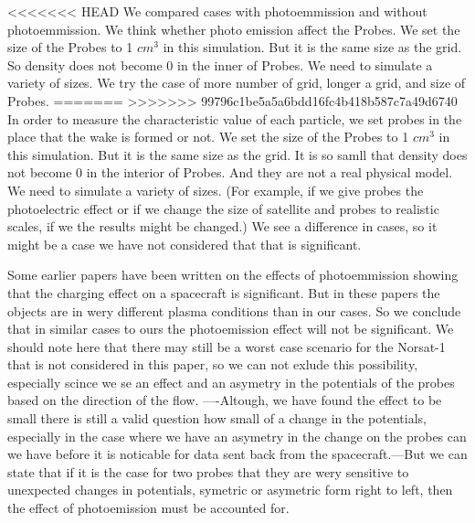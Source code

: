 

<<<<<<< HEAD
We compared cases with photoemmission and without photoemmission. We think whether photo emission affect the Probes.
We set the size of the Probes to 1 $cm^3$ in this simulation. But it is the same size as the grid.
So density does not become 0 in the inner of Probes. We need to simulate a variety of sizes.
We try the case of more number of grid, longer a grid, and size of Probes.
=======
>>>>>>> 99796c1be5a5a6bdd16fc4b418b587c7a49d6740
In order to measure the characteristic value of each particle, we set probes in the
place that the wake is formed or not. 
We set the size of the Probes to 1 $cm^3$ in this simulation. But it is the same size as the grid.
It is so samll that density does not become 0 in the interior of Probes. And they are not a real 
physical model. We need to simulate a variety of sizes.
(For example, if we give probes the photoelectric effect or if we change the size of satellite and 
probes to realistic scales, if we the results might be changed.)
We see a difference in cases, so it might be a case we have not considered that that is significant.

Some earlier papers have been written on the effects of photoemmission showing that the charging effect 
on a spacecraft is significant.\citep{Ergun} But in these papers the objects are in wery different
plasma conditions than in our cases. So we conclude that in similar cases to ours the photoemission effect
will not be significant. We should note here that there may still be a worst case scenario for the Norsat-1
that is not considered in this paper, so we can not exlude this possibility, especially scince we se an effect and an
asymetry in the potentials of the probes based on the direction of the flow. ----Altough, we have found the effect to be small 
there is still a valid question how small of a change in the potentials, especially in the case where we have an asymetry in
the change on the probes can we have before it is noticable for data sent back from the spacecraft.---But we can state that if 
it is the case for two probes that they are wery sensitive to unexpected changes in potentials, symetric or asymetric form 
right to left, then the effect of photoemission must be accounted for.
